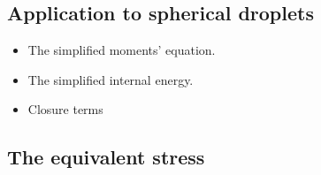 
\subsection{Application to spherical droplets}


\begin{itemize}
    \item The simplified moments' equation.
    \item The simplified internal energy. 
    \item Closure terms
\end{itemize}
\subsection{The equivalent stress}